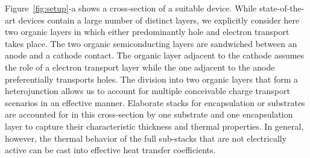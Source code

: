 \documentclass[%
9pt,
 aip,
rsi,%
 amsmath,amssymb,
preprint,%
]{revtex4-1}
\begin{document}
Figure~\ref{fig:setup}-a shows a cross-section of a suitable device. 
While state-of-the-art devices contain a large number of distinct layers, we explicitly consider here two organic layers in which either predominantly hole and electron transport takes place. 
The two organic semiconducting layers are sandwiched between an anode and a cathode contact.
The organic layer adjacent to the cathode assumes the role of a electron transport layer while the one adjacent to the anode preferentially transports holes.
The division into two organic layers that form a heterojunction allows us to account for multiple conceivable charge transport scenarios in an effective manner.
Elaborate stacks for encapsulation or substrates are accounted for in this cross-section by one substrate and one encapsulation layer to capture their characteristic thickness and thermal properties. In general, however, the thermal behavior of the full sub-stacks that are not electrically active can be cast into effective heat transfer coefficients.
 
\end{document}
